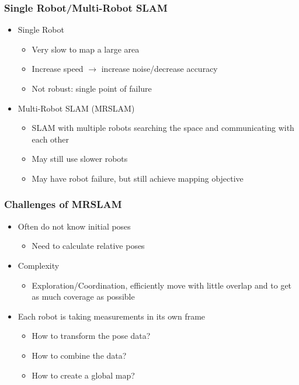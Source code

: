 \begin{frame}
\frametitle{Single Robot/Multi-Robot SLAM}
\begin{itemize}
\item Single Robot
\begin{itemize}
\item Very slow to map a large area
\item Increase speed $\rightarrow$ increase noise/decrease accuracy
\item Not robust: single point of failure
\end{itemize}
\item Multi-Robot SLAM (MRSLAM)
\begin{itemize}
\item SLAM with multiple robots searching the space and communicating with each other
\item May still use slower robots
\item May have robot failure, but still achieve mapping objective
\end{itemize}
\end{itemize}
\end{frame}

\begin{frame}
\frametitle{Challenges of MRSLAM}
\begin{itemize}
\item Often do not know initial poses
\begin{itemize}
\item Need to calculate relative poses
\end{itemize}
\item Complexity 
\begin{itemize}
\item Exploration/Coordination, efficiently move with little overlap and to get as much coverage as possible	
\end{itemize}
\item Each robot is taking measurements in its own frame
\begin{itemize}
\item How to transform the pose data?
\item How to combine the data?
\item How to create a global map?
\end{itemize} 

\end{itemize}
\end{frame}


